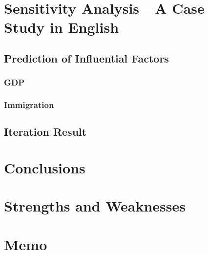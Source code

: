 \documentclass{mcmthesis}
\begin{document}
  \section{Sensitivity Analysis---A Case Study in English}

    \subsection{Prediction of Influential Factors}


      \subsubsection{GDP}

      \subsubsection{Immigration}


    \subsection{Iteration Result}%






  \section{Conclusions}

  \section{Strengths and Weaknesses}

  \section*{Memo}
\end{document}
